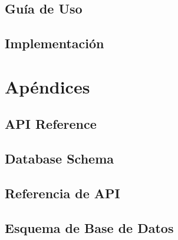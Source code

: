 \documentclass[12pt,a4paper]{report}
\begin{document}
\chapter{Guía de Uso}


\chapter{Implementación}


\appendix
\part{Apéndices}

\chapter{API Reference}


\chapter{Database Schema}


\chapter{Referencia de API}


\chapter{Esquema de Base de Datos}




\end{document}
